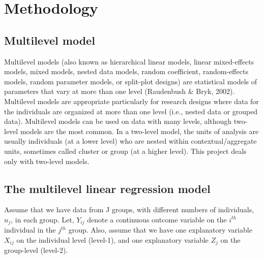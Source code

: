 \documentclass[12pt,oneside,a4paper]{reedthesis}
\begin{document}
\hypertarget{methodology}{%
\chapter{Methodology}\label{methodology}}

\hypertarget{multilevel-model}{%
\section{Multilevel model}\label{multilevel-model}}

Multilevel models (also known as hierarchical linear models, linear mixed-effects models, mixed models, nested data models, random coefficient, random-effects models, random parameter models, or split-plot designs) are statistical models of parameters that vary at more than one level (Raudenbush \& Bryk, 2002). Multilevel models are appropriate particularly for research designs where data for the individuals are organized at more than one level (i.e., nested data or grouped data). Multilevel models can be used on data with many levels, although two-level models are the most common. In a two-level model, the units of analysis are usually individuals (at a lower level) who are nested within contextual/aggregate units, sometimes called cluster or group (at a higher level). This project deals only with two-level models.

\hypertarget{the-multilevel-linear-regression-model}{%
\section{The multilevel linear regression model}\label{the-multilevel-linear-regression-model}}

Assume that we have data from J groups, with different numbers of individuals, \(n_j\), in each group. Let, \(Y_{i j}\) denote a continuous outcome variable on the \(i^{th}\) individual in the \(j^{th}\) group. Also, assume that we have one explanatory variable \(X_{i j}\) on the individual level (level-1), and one explanatory variable \(Z_j\) on the group-level (level-2).
\end{document}
